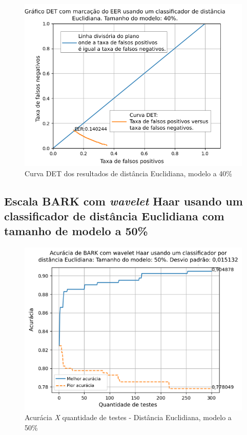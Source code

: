 \begin{figure}[!ht]
	\centering
	\includegraphics[width=\linewidth]{images/results/det/DET_for_classifier_Euclidian_40}
	\caption{Curva DET dos resultados de distância Euclidiana, modelo a 40\%}
	\label{fig:detforclassifiereuclidian40}
\end{figure}

\subsection{Escala BARK com \textit{wavelet} Haar usando um classificador de distância Euclidiana com tamanho de modelo a 50\%}



\begin{figure}[!ht]
	\centering
	\includegraphics[width=\linewidth]{images/results/confusionMatrices/classifier_Euclidian_50}
	\caption{Acurácia \textit{X} quantidade de testes - Distância Euclidiana, modelo a 50\%}
	\label{fig:classifiereuclidian50}
\end{figure}


